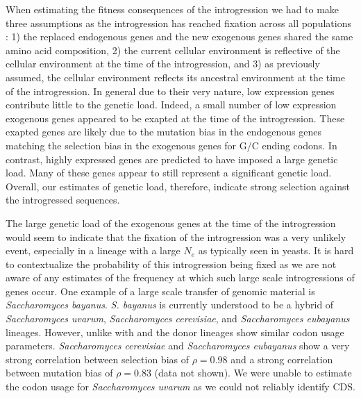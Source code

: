When estimating the fitness consequences of the introgression we had to make three assumptions as the introgression has reached fixation across all \kluyveri populations \citet{friedrich2015}:
1) the replaced endogenous genes and the new exogenous genes shared the same amino acid composition, 2) the current \kluyveri cellular environment is reflective of the cellular environment at the time of the introgression, and 3) as previously assumed, the \gossypii cellular environment reflects its ancestral environment at the time of the introgression.
In general due to their very nature, low expression genes contribute little to the genetic load.
Indeed, a small number of low expression exogenous genes appeared to be exapted at the time of the introgression.
These exapted genes are likely due to the mutation bias in the endogenous genes matching the selection bias in the exogenous genes for G/C ending codons.
In contrast, highly expressed genes are predicted to have imposed a large genetic load.
Many of these genes appear to still represent a significant genetic load.
Overall, our estimates of genetic load, therefore, indicate strong selection against the introgressed sequences.

The large genetic load of the exogenous genes at the time of the introgression would seem to indicate that the fixation of the introgression was a very unlikely event, especially in a lineage with a large $N_e$ as typically seen in yeasts.
It is hard to contextualize the probability of this introgression being fixed as we are not aware of any estimates of the frequency at which such large scale introgressions of genes occur.
One example of a large scale transfer of genomic material is \emph{Saccharomyces bayanus}.
\emph{S. bayanus} is currently understood to be a hybrid of \emph{Saccharomyces uvarum}, \emph{Saccharomyces cerevisiae}, and \emph{Saccharomyces eubayanus} lineages.
However, unlike with \kluyveri and \gossypii the donor lineages show similar codon usage parameters.
\emph{Saccharomyces cerevisiae} and \emph{Saccharomyces eubayanus} show a very strong correlation between selection bias \DE of $\rho = 0.98$ and a strong correlation between mutation bias \DM of $ \rho = 0.83$ (data not shown).
We were unable to estimate the codon usage for \emph{Saccharomyces uvarum} as we could not reliably identify CDS.


